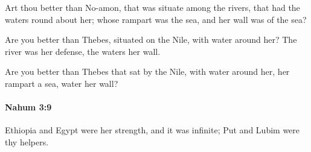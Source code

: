 			\begin{versebox}
					\item[BHS] 
					\item[LXX] 
					\item[ASV] Art thou better than No-amon, that was situate among the rivers, that had the waters round about her; whose rampart was the sea, and her wall was of the sea?
					\item[NIV] Are you better than Thebes, situated on the Nile, with water around her? The river was her defense, the waters her wall.
					\item[NRSV] Are you better than Thebes that sat by the Nile, with water around her, her rampart a sea, water her wall?
			\end{versebox}

		\paragraph{Nahum 3:9} %
			\label{NAHUM-3-9}

			Ethiopia and Egypt were her strength, and it was infinite; Put and Lubim were thy helpers.

